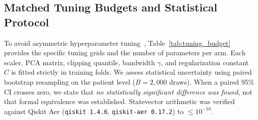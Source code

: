 \documentclass[conference]{IEEEtran}
\begin{document}
\subsection{Matched Tuning Budgets and Statistical Protocol}
To avoid asymmetric hyperparameter tuning~\cite{bowles2024better}, Table~\ref{tab:tuning_budget} provides the specific tuning grids and the number of parameters per arm. Each scaler, PCA matrix, clipping quantile, bandwidth $\gamma$, and regularization constant $C$ is fitted strictly in training folds. We assess statistical uncertainty using paired bootstrap resampling on the patient level ($B=2,000$ draws). When a paired 95\% CI crosses zero, we state that \emph{no statistically significant difference was found}, not that formal equivalence was established. Statevector arithmetic was verified against Qiskit Aer (\texttt{qiskit 1.4.6}, \texttt{qiskit-aer 0.17.2}) to $\le 10^{-10}$.

\begin{table}[!t]
\caption{Matched Hyperparameter Tuning Budgets Across Classical and Quantum Arms (All Tuned Strictly on Inner 5-Fold Patient-Grouped Train CV)}
\label{tab:tuning_budget}
\centering
{}
\end{table}
\end{document}

